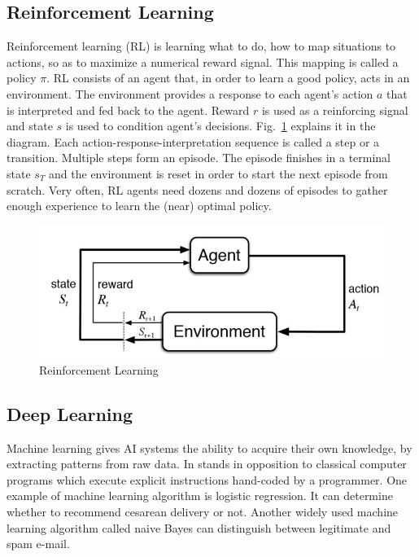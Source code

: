 \subsection{Reinforcement Learning}

Reinforcement learning (RL) is learning what to do, how to map situations to actions, so as to maximize a numerical reward signal.\cite{Book.RLAI} This mapping is called a policy $\pi$. RL consists of an agent that, in order to learn a good policy, acts in an environment. The environment provides a response to each agent's action $a$ that is interpreted and fed back to the agent. Reward $r$ is used as a reinforcing signal and state $s$ is used to condition agent's decisions. Fig.~\ref{Fig.RL} explains it in the diagram.
Each action-response-interpretation sequence is called a step or a transition. Multiple steps form an episode. The episode finishes in a terminal state $s_T$ and the environment is reset in order to start the next episode from scratch. Very often, RL agents need dozens and dozens of episodes to gather enough experience to learn the (near) optimal policy.

\begin{figure}[H]
\includegraphics[]{figures/RL.jpg}
\caption{Reinforcement Learning\protect\cite{Book.RLAI}}
\label{Fig.RL}
\end{figure}


\subsection{Deep Learning}

Machine learning gives AI systems the ability to acquire their own knowledge, by extracting patterns from raw data. In stands in opposition to classical computer programs which execute explicit instructions hand-coded by a programmer.
One example of machine learning algorithm is logistic regression. It can determine whether to recommend cesarean delivery or not\cite{Study.Cesarean}. Another widely used machine learning algorithm called naive Bayes can distinguish between legitimate and spam e-mail.

